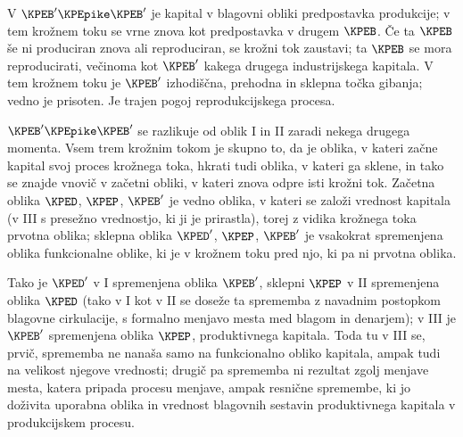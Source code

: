 \documentclass[kapital_02.tex]{subfiles}
\begin{document}
V \( \KPEB' \KPEpike \KPEB' \) je kapital v blagovni obliki predpostavka produkcije; v tem krožnem toku se vrne znova kot predpostavka v drugem \( \KPEB \). Če ta \( \KPEB \) še ni produciran znova ali reproduciran, se krožni tok zaustavi; ta \( \KPEB \) se mora reproducirati, večinoma kot \( \KPEB' \) kakega drugega industrijskega kapitala. V \KPEstran tem krožnem toku je \( \KPEB' \) izhodiščna, prehodna in sklepna točka gibanja; vedno je prisoten. Je trajen pogoj reprodukcijskega procesa.

\( \KPEB' \KPEpike \KPEB' \) se razlikuje od oblik I in II zaradi nekega drugega momenta. Vsem trem krožnim tokom je skupno to, da je oblika, v kateri začne kapital svoj proces krožnega toka, hkrati tudi oblika, v kateri ga sklene, in tako se znajde vnovič v začetni obliki, v kateri znova odpre isti krožni tok. Začetna oblika \( \KPED \), \( \KPEP \), \( \KPEB' \) je vedno oblika, v kateri se založi vrednost kapitala (v III s presežno vrednostjo, ki ji je prirastla), torej z vidika krožnega toka prvotna oblika; sklepna oblika \( \KPED' \), \( \KPEP \), \( \KPEB' \) je vsakokrat spremenjena oblika funkcionalne oblike, ki je v krožnem toku pred njo, ki pa ni prvotna oblika.

Tako je \( \KPED' \) v I spremenjena oblika \( \KPEB' \), sklepni \( \KPEP \) v II spremenjena oblika \( \KPED \) (tako v I kot v II se doseže ta sprememba z navadnim postopkom blagovne cirkulacije, s formalno menjavo mesta med blagom in denarjem); v III je \( \KPEB' \) spremenjena oblika \( \KPEP \), produktivnega kapitala. Toda tu v III se, prvič, sprememba ne nanaša samo na funkcionalno obliko kapitala, ampak tudi na velikost njegove vrednosti; drugič pa sprememba ni rezultat zgolj menjave mesta, katera pripada procesu menjave, ampak resnične spremembe, ki jo doživita uporabna oblika in vrednost blagovnih sestavin produktivnega kapitala v produkcijskem procesu.
\end{document}
